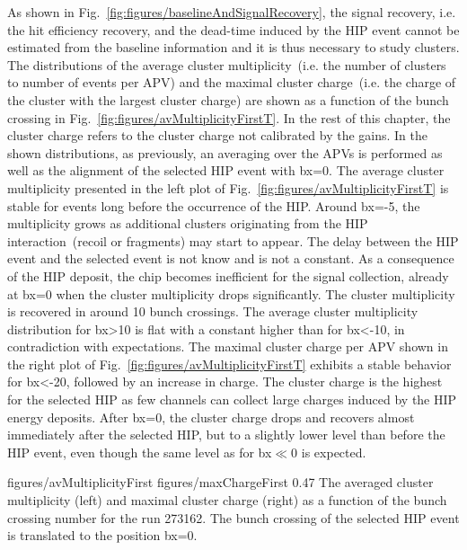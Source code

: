 As shown in Fig.~\ref{fig:figures/baselineAndSignalRecovery}, the signal recovery, i.e. the hit efficiency recovery, and the dead-time induced by the HIP event cannot be estimated from the baseline information and it is thus necessary to study clusters. The distributions of the average cluster multiplicity~(i.e. the number of clusters to number of events per APV) and the maximal cluster charge~(i.e. the charge of the cluster with the largest cluster charge)  are shown as a function of the bunch crossing in Fig.~\ref{fig:figures/avMultiplicityFirstT}. In the rest of this chapter, the cluster charge refers to the cluster charge not calibrated by the gains. In the shown distributions, as previously, an averaging over the APVs is performed as well as the alignment of the selected HIP event with bx=0. The average cluster multiplicity presented in the left plot of Fig.~\ref{fig:figures/avMultiplicityFirstT} is stable for events long before the occurrence of the HIP. Around bx=-5, the multiplicity grows as additional clusters originating from the HIP interaction~(recoil or fragments) may start to appear. The delay between the HIP event and the selected event is not know and is not a constant. As a consequence of the HIP deposit, the chip becomes inefficient for the signal collection, already at bx=0 when  the cluster multiplicity drops significantly. The cluster multiplicity is recovered in around 10 bunch crossings. The average cluster multiplicity distribution for bx>10 is flat with a constant higher than for bx<-10, in contradiction with expectations. The maximal cluster charge per APV shown in the right plot of Fig.~\ref{fig:figures/avMultiplicityFirstT} exhibits a stable behavior for bx<-20, followed by an increase in charge. The cluster charge is the highest for the selected HIP as few channels can collect large charges induced by the HIP energy deposits. After bx=0, the cluster charge drops and recovers almost immediately after the selected HIP, but to a slightly lower level than before the HIP event, even though the same level as for bx$\ll$0 is expected. 

                 {figures/avMultiplicityFirst} %
                 {figures/maxChargeFirst} %
                 {0.47}       %
                 { The averaged cluster multiplicity (left) and maximal cluster charge (right) as a function of the bunch crossing number for the run 273162. The bunch crossing of the selected HIP event is translated to the position bx=0. } %

